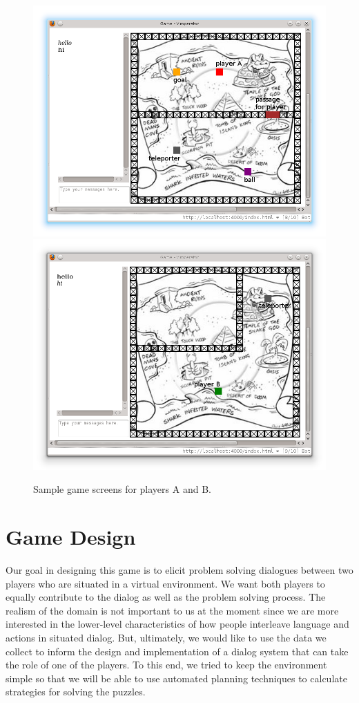 

\begin{figure}
\includegraphics[scale=0.4]{player1_new_with_label.png} 
\includegraphics[scale=0.4]{player2_new_with_label.png}
\caption{Sample game screens for players A and B.}
\label{fig:player-screenshots}
\end{figure}

\section{Game Design}

Our goal in designing this game is to elicit problem solving dialogues
between two players who are situated in a virtual environment.  We
want both players to equally contribute to the dialog as well as the
problem solving process. The realism of the domain is not important to
us at the moment since we are more interested in the lower-level
characteristics of how people interleave language and actions in
situated dialog.  But, ultimately, we would like to use the data we
collect to inform the design and implementation of a dialog system
that can take the role of one of the players. To this end, we tried to
keep the environment simple so that we will be able to use
automated planning techniques to calculate strategies for solving the
puzzles.

